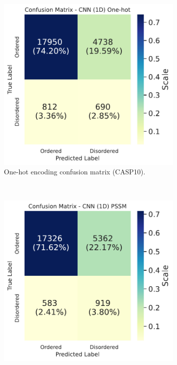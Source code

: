 \documentclass{l4proj}
\begin{document}
\begin{figure}[!htb] 
    \centering
    \begin{subfigure}[b]{0.48\textwidth}
        \includegraphics[width=\textwidth]{images/confmats/CASP10CNN1D1hot-cf.pdf}
        \caption{One-hot encoding confusion matrix (CASP10).}
        \label{fig:caspcf1d1hot}
    \end{subfigure}
    ~
    \begin{subfigure}[b]{0.48\textwidth}
        \includegraphics[width=\textwidth]{images/confmats/CASP10CNN1Dpssm-cf.pdf}

\end{subfigure}
\end{figure}
\end{document}
